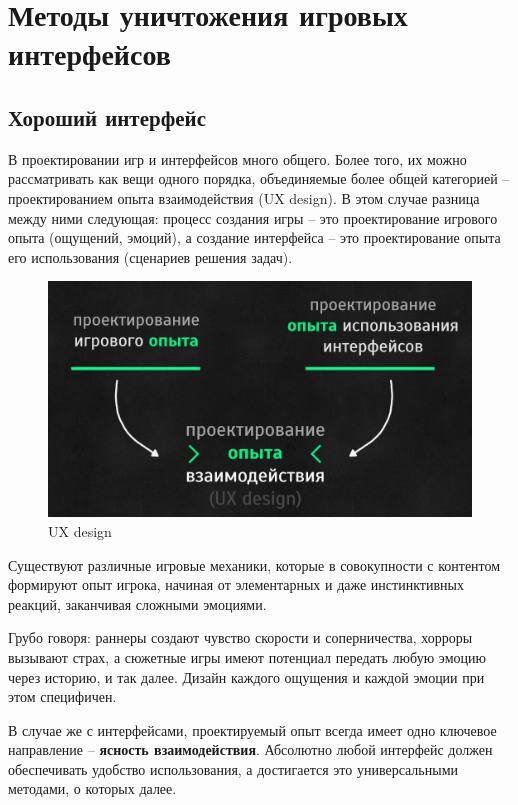 \documentclass{article}
\begin{document}
\section{Методы уничтожения игровых интерфейсов}
\subsection{Хороший интерфейс}
В проектировании игр и интерфейсов много общего. Более того, их можно рассматривать как вещи одного порядка, объединяемые более общей категорией -- проектированием опыта взаимодействия (UX design). В этом случае разница между ними следующая: процесс создания игры -- это проектирование игрового опыта (ощущений, эмоций), а создание интерфейса -- это проектирование опыта его использования (сценариев решения задач).

\begin{figure}[H]
  \includegraphics[width=\textwidth]{res/img/uxDesign.png}
  \caption{UX design}
\end{figure}

Существуют различные игровые механики, которые в совокупности с контентом формируют опыт игрока, начиная от элементарных и даже инстинктивных реакций, заканчивая сложными эмоциями.

Грубо говоря: раннеры создают чувство скорости и соперничества, хорроры вызывают страх, а сюжетные игры имеют потенциал передать любую эмоцию через историю, и так далее. Дизайн каждого ощущения и каждой эмоции при этом специфичен.

В случае же с интерфейсами, проектируемый опыт всегда имеет одно ключевое направление -- \textbf{ясность взаимодействия}. Абсолютно любой интерфейс должен обеспечивать удобство использования, а достигается это универсальными методами, о которых далее.
\end{document}
